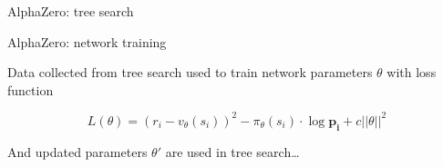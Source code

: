 \documentclass{beamer}
\begin{document}
\begin{frame}[allowframebreaks]{AlphaZero: tree search}

% 

\begin{figure}
\centering
\scalebox{.8}{

}
\end{figure}

\begin{figure}
\centering
\scalebox{.8}{

}
\end{figure}

\begin{figure}
\centering
\scalebox{.8}{

}
\end{figure}

\begin{figure}
\centering
\scalebox{.8}{

}
\end{figure}

\begin{figure}
\centering
\scalebox{.8}{

}
\end{figure}

\begin{figure}
\centering
\scalebox{.8}{

}
\end{figure}



\end{frame}



\begin{frame}{AlphaZero: network training}

Data collected from tree search used to train network parameters $\theta$ with loss function

\[
    L(\theta) = (r_i - v_\theta(s_i))^2 - \pi_\theta(s_i) \cdot \log \mathbf{p_i} + c ||\theta||^2
\]

And updated parameters $\theta'$ are used in tree search\dots

\end{frame}
\end{document}
